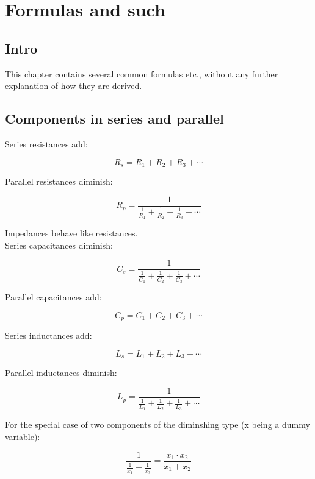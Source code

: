\documentclass[12pt,a4paper]{report}
\begin{document}
\maketitle

\tableofcontents


\chapter{Formulas and such}

\section{Intro}

This chapter contains several common formulas etc., without any further explanation of how they are derived.

\section{Components in series and parallel}

Series resistances add:

\[ R_s = R_1 + R_2 + R_3 + \cdots \]

Parallel resistances diminish:

\[ R_p = \frac{1}{ \frac{1}{R_1} + \frac{1}{R_2} + \frac{1}{R_3} + \cdots} \]

Impedances behave like resistances.\\

Series capacitances diminish:

\[ C_s = \frac{1}{ \frac{1}{C_1} + \frac{1}{C_2} + \frac{1}{C_3} + \cdots} \]

Parallel capacitances add:

\[ C_p = C_1 + C_2 + C_3 + \cdots \]

Series inductances add:

\[ L_s = L_1 + L_2 + L_3 + \cdots \]

Parallel inductances diminish:

\[ L_p = \frac{1}{ \frac{1}{L_1} + \frac{1}{L_2} + \frac{1}{L_3} + \cdots} \]

For the special case of two components of the diminshing type (x being a dummy variable):

\[ \frac{1}{ \frac{1}{x_1} + \frac{1}{x_2} } = \frac{x_1 \cdot x_2}{x_1 + x_2} \]
\end{document}
